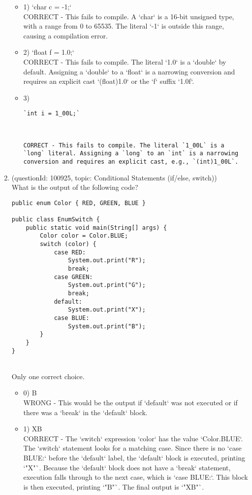 \documentclass[12pt]{article}
\begin{document}
\begin{enumerate}[label=(\arabic*)]
\begin{itemize}
\item 1) `char c = -1;`
 \\ 
CORRECT - This fails to compile. A `char` is a 16-bit unsigned type, with a range from 0 to 65535. The literal `-1` is outside this range, causing a compilation error.

\item 2) `float f = 1.0;`
 \\ 
CORRECT - This fails to compile. The literal `1.0` is a `double` by default. Assigning a `double` to a `float` is a narrowing conversion and requires an explicit cast `(float)1.0` or the `f` suffix `1.0f`.

\item 3) \begin{verbatim}`int i = 1_00L;`\end{verbatim}
 \\ 
\begin{verbatim}CORRECT - This fails to compile. The literal `1_00L` is a `long` literal. Assigning a `long` to an `int` is a narrowing conversion and requires an explicit cast, e.g., `(int)1_00L`.\end{verbatim}

\end{itemize}
\item (questionId: 100925, topic: Conditional Statements (if/else, switch)) \\ 
What is the output of the following code?\n\begin{verbatim}
public enum Color { RED, GREEN, BLUE }

public class EnumSwitch {
    public static void main(String[] args) {
        Color color = Color.BLUE;
        switch (color) {
            case RED:
                System.out.print("R");
                break;
            case GREEN:
                System.out.print("G");
                break;
            default:
                System.out.print("X");
            case BLUE:
                System.out.print("B");
        }
    }
}
\end{verbatim}
\\ \noindent Only one correct choice. 
\begin{itemize}
\item 0) B
 \\ 
WRONG - This would be the output if `default` was not executed or if there was a `break` in the `default` block.

\item 1) XB
 \\ 
CORRECT - The `switch` expression `color` has the value `Color.BLUE`. The `switch` statement looks for a matching case. Since there is no `case BLUE:` before the `default` label, the `default` block is executed, printing `"X"`. Because the `default` block does not have a `break` statement, execution falls through to the next case, which is `case BLUE:`. This block is then executed, printing `"B"`. The final output is `"XB"`.


\end{itemize}
\end{enumerate}
\end{document}
